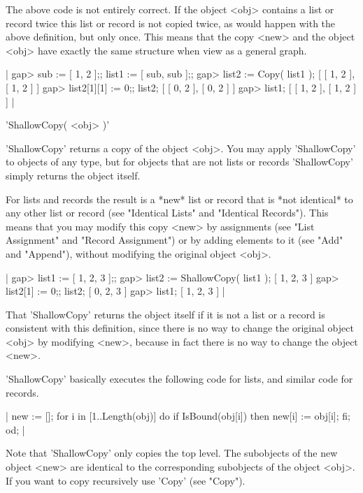 The above code is  not entirely correct.  If the object  <obj> contains a
list or record twice  this list or record is not  copied twice,  as would
happen  with the  above  definition, but only once.   This means that the
copy <new> and the object <obj> have exactly the same structure when view
as a general graph.

|    gap> sub := [ 1, 2 ];;  list1 := [ sub, sub ];;
    gap> list2 := Copy( list1 );
    [ [ 1, 2 ], [ 1, 2 ] ]
    gap> list2[1][1] := 0;;  list2;
    [ [ 0, 2 ], [ 0, 2 ] ]
    gap> list1;
    [ [ 1, 2 ], [ 1, 2 ] ] |

%

'ShallowCopy( <obj> )'

'ShallowCopy' returns  a    copy of the object    <obj>.   You may  apply
'ShallowCopy' to objects of any type, but for  objects that are not lists
or records 'ShallowCopy' simply returns the object itself.

For lists  and records the result  is a *new* list or record that is *not
identical*  to  any  other  list  or record  (see  "Identical  Lists" and
"Identical Records").  This means that you may modify this  copy <new> by
assignments (see "List Assignment" and "Record  Assignment") or by adding
elements  to it (see "Add" and "Append"), without  modifying the original
object <obj>.

|    gap> list1 := [ 1, 2, 3 ];;
    gap> list2 := ShallowCopy( list1 );
    [ 1, 2, 3 ]
    gap> list2[1] := 0;;  list2;
    [ 0, 2, 3 ]
    gap> list1;
    [ 1, 2, 3 ] |

That 'ShallowCopy'  returns the object itself if  it is not  a  list or a
record  is consistent with  this  definition, since  there  is no  way to
change the original  object  <obj> by  modifying <new>, because  in  fact
there is no way to change the object <new>.

'ShallowCopy'   basically executes  the   following  code for lists,  and
similar code for records.

|    new := [];
    for i  in [1..Length(obj)]  do
        if IsBound(obj[i])  then
            new[i] := obj[i];
        fi;
    od; |

Note that 'ShallowCopy' only copies the top level.  The subobjects of the
new object <new>  are identical  to  the corresponding  subobjects of the
object <obj>.  If you want to copy recursively use 'Copy' (see "Copy").

